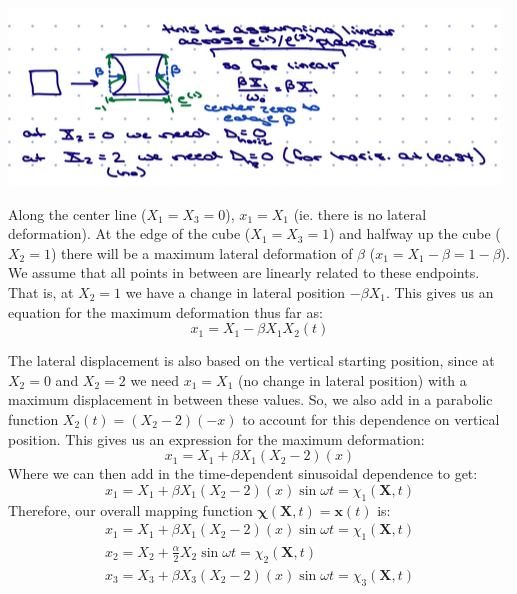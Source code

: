 \includegraphics{Dawson-figures/3.png}

Along the center line ($X_1 = X_3 = 0$), $x_1 = X_1$ (ie. there is no lateral deformation). At the edge of the cube ($X_1 = X_3 = 1$) and halfway up the cube ($X_2 = 1$) there will be a maximum lateral deformation of $\beta$ ($x_1 = X_1 - \beta = 1-\beta$). We assume that all points in between are linearly related to these endpoints. That is, at $X_2 = 1$ we have a change in lateral position $-\beta X_1$. This gives us an equation for the maximum deformation thus far as:
\begin{equation}
    x_1 = X_1 - \beta X_1 X_2(t)
\end{equation}

The lateral displacement is also based on the vertical starting position, since at $X_2 = 0$ and $X_2 = 2$ we need $x_1 = X_1$ (no change in lateral position) with a maximum displacement in between these values. So, we also add in a parabolic function $X_2(t) = (X_2 - 2)(-x)$ to account for this dependence on vertical position. This gives us an expression for the maximum deformation:
\begin{equation}
    x_1 = X_1 + \beta X_1(X_2 - 2)(x)
\end{equation}
Where we can then add in the time-dependent sinusoidal dependence to get:
\begin{equation}
    x_1 = X_1 + \beta X_1(X_2 - 2)(x)\sin{\omega t} = \chi_1(\bm{X},t)
\end{equation}
Therefore, our overall mapping function $\bm{\chi}(\bm{X},t) = \bm{x}(t)$ is:
\begin{equation}
    \begin{split}
        x_1 = X_1 + \beta X_1(X_2 - 2)(x)\sin{\omega t} = \chi_1(\bm{X},t) \\
        x_2 = X_2 + \frac{\alpha}{2}X_2 \sin{\omega t} = \chi_2(\bm{X},t) \\
        x_3 = X_3 + \beta X_3(X_2 - 2)(x)\sin{\omega t} = \chi_3(\bm{X},t)
    \end{split}
\end{equation}

